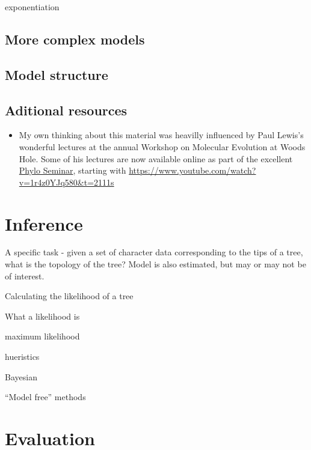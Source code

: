 \documentclass[
]{book}
\providecommand{\tightlist}{%
  \setlength{\itemsep}{0pt}\setlength{\parskip}{0pt}}
\begin{document}
exponentiation

\hypertarget{more-complex-models}{%
\section{More complex models}\label{more-complex-models}}

\hypertarget{model-structure}{%
\section{Model structure}\label{model-structure}}

\hypertarget{aditional-resources}{%
\section{Aditional resources}\label{aditional-resources}}

\begin{itemize}
\tightlist
\item
  My own thinking about this material was heavilly influenced by Paul Lewis's wonderful lectures at the annual Workshop on Molecular Evolution at Woods Hole. Some of his lectures are now available online as part of the excellent \href{https://www.youtube.com/channel/UCbAzhfySv7nLCrNYqZvBSMg}{Phylo Seminar}, starting with \url{https://www.youtube.com/watch?v=1r4z0YJq580\&t=2111s}
\end{itemize}

\hypertarget{inference}{%
\chapter{Inference}\label{inference}}

A specific task - given a set of character data corresponding to the tips of a tree, what is the topology of the tree? Model is also estimated, but may or may not be of interest.

Calculating the likelihood of a tree

What a likelihood is

maximum likelihood

hueristics

Bayesian

``Model free'' methods

\hypertarget{evaluation}{%
\chapter{Evaluation}\label{evaluation}}
\end{document}
